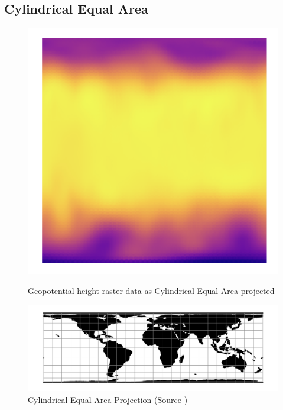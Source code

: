 \subsection{Cylindrical Equal Area}

\begin{figure}[H]
    \centering
    \begin{minipage}{0.30\textwidth}
        \centering
        \includegraphics[width=0.9\linewidth]{figures/chapter-8/prect_cea.png}
        \caption{ Geopotential height raster data as Cylindrical Equal Area projected}
        \label{fig:cea_geopoth_raster}
    \end{minipage}\hfill
    \begin{minipage}{0.30\textwidth}
        \centering
        \includegraphics[width=0.9\linewidth]{figures/chapter-8/cea.png}
        \caption{Cylindrical Equal Area Projection (Source \cite{PROJ_SITE})}
        \label{fig:cea_prect_raster}
    \end{minipage}\hfill
    \begin{minipage}{0.30\textwidth}

\end{minipage}
\end{figure}
